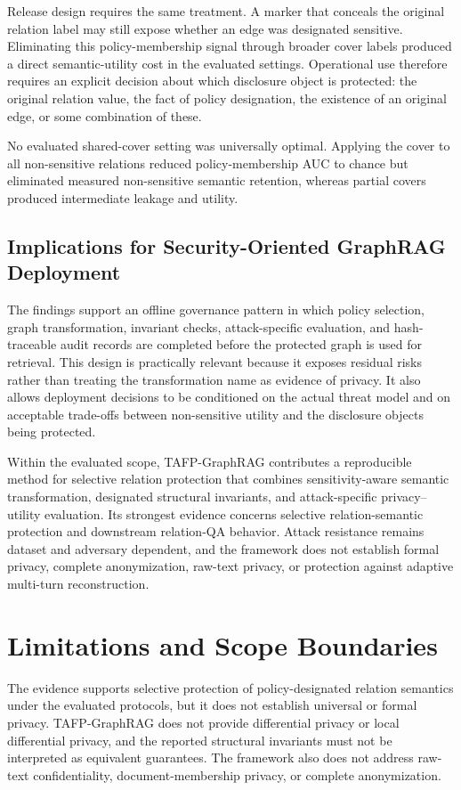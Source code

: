 \documentclass[preprint,12pt]{elsarticle}
\begin{document}
Release design requires the same treatment. A marker that conceals the original relation label may still expose whether an edge was designated sensitive. Eliminating this policy-membership signal through broader cover labels produced a direct semantic-utility cost in the evaluated settings. Operational use therefore requires an explicit decision about which disclosure object is protected: the original relation value, the fact of policy designation, the existence of an original edge, or some combination of these.

No evaluated shared-cover setting was universally optimal. Applying the cover to all non-sensitive relations reduced policy-membership AUC to chance but eliminated measured non-sensitive semantic retention, whereas partial covers produced intermediate leakage and utility.

\subsection{Implications for Security-Oriented GraphRAG Deployment}
The findings support an offline governance pattern in which policy selection, graph transformation, invariant checks, attack-specific evaluation, and hash-traceable audit records are completed before the protected graph is used for retrieval. This design is practically relevant because it exposes residual risks rather than treating the transformation name as evidence of privacy. It also allows deployment decisions to be conditioned on the actual threat model and on acceptable trade-offs between non-sensitive utility and the disclosure objects being protected.

Within the evaluated scope, TAFP-GraphRAG contributes a reproducible method for selective relation protection that combines sensitivity-aware semantic transformation, designated structural invariants, and attack-specific privacy--utility evaluation. Its strongest evidence concerns selective relation-semantic protection and downstream relation-QA behavior. Attack resistance remains dataset and adversary dependent, and the framework does not establish formal privacy, complete anonymization, raw-text privacy, or protection against adaptive multi-turn reconstruction.

\section{Limitations and Scope Boundaries}
The evidence supports selective protection of policy-designated relation semantics under the evaluated protocols, but it does not establish universal or formal privacy. TAFP-GraphRAG does not provide differential privacy or local differential privacy, and the reported structural invariants must not be interpreted as equivalent guarantees. The framework also does not address raw-text confidentiality, document-membership privacy, or complete anonymization.
\end{document}

